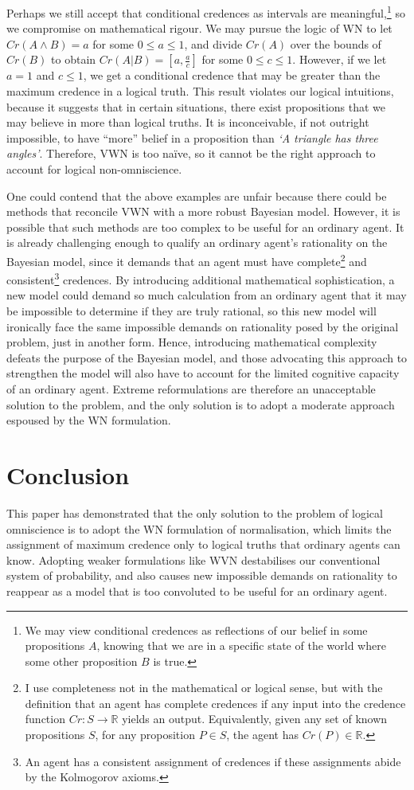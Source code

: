 \documentclass[12pt]{article}
\begin{document}
Perhaps we still accept that conditional credences as intervals are meaningful,\footnote{We may view conditional credences as reflections of our belief in some propositions $A$, knowing that we are in a specific state of the world where some other proposition $B$ is true.} so we compromise on mathematical rigour. We may pursue the logic of WN to let $Cr(A\land B)=a$ for some $0\leq a\leq1$, and divide $Cr(A)$ over the bounds of $Cr(B)$ to obtain $Cr(A|B)=[a,\frac{a}{c}]$ for some $0\leq c\leq1$. However, if we let $a=1$ and $c\leq 1$, we get a conditional credence that may be greater than the maximum credence in a logical truth. This result violates our logical intuitions, because it suggests that in certain situations, there exist propositions that we may believe in more than logical truths. It is inconceivable, if not outright impossible, to have ``more'' belief in a proposition than \textit{`A triangle has three angles'}. Therefore, VWN is too na\"ive, so it cannot be the right approach to account for logical non-omniscience.

One could contend that the above examples are unfair because there could be methods that reconcile VWN with a more robust Bayesian model. However, it is possible that such methods are too complex to be useful for an ordinary agent. It is already challenging enough to qualify an ordinary agent's rationality on the Bayesian model, since it demands that an agent must have complete\footnote{I use completeness not in the mathematical or logical sense, but with the definition that an agent has complete credences if any input into the credence function $Cr:S\rightarrow\mathbb{R}$ yields an output. Equivalently, given any set of known propositions $S$, for any proposition $P\in S$, the agent has $Cr(P)\in\mathbb{R}$.} and consistent\footnote{An agent has a consistent assignment of credences if these assignments abide by the Kolmogorov axioms.} credences. By introducing additional mathematical sophistication, a new model could demand so much calculation from an ordinary agent that it may be impossible to determine if they are truly rational, so this new model will ironically face the same impossible demands on rationality posed by the original problem, just in another form. Hence, introducing mathematical complexity defeats the purpose of the Bayesian model, and those advocating this approach to strengthen the model will also have to account for the limited cognitive capacity of an ordinary agent. Extreme reformulations are therefore an unacceptable solution to the problem, and the only solution is to adopt a moderate approach espoused by the WN formulation.
\section{Conclusion}
This paper has demonstrated that the only solution to the problem of logical omniscience is to adopt the WN formulation of normalisation, which limits the assignment of maximum credence only to logical truths that ordinary agents can know. Adopting weaker formulations like WVN destabilises our conventional system of probability, and also causes new impossible demands on rationality to reappear as a model that is too convoluted to be useful for an ordinary agent.
\pagebreak
\printbibliography
\end{document}
